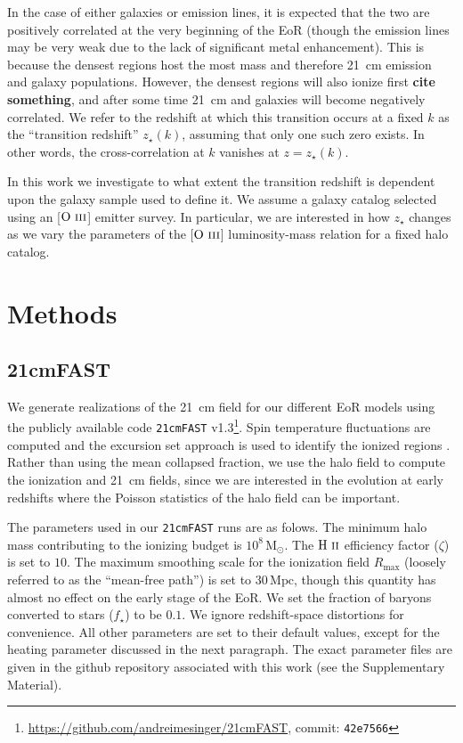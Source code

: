 \documentclass[a4paper,fleqn,usenatbib]{mnras}
\newcommand{\tfast}{\texttt{21cmFAST}}
\newcommand{\HII}{\ensuremath{\text{H~\textsc{ii}}}}
\newcommand{\OIII}{\ensuremath{\text{O~\textsc{iii}}}}
\newcommand{\Msun}{\ensuremath{\text{M}_\odot}}
\newcommand{\Mpc}{\ensuremath{\text{Mpc}}}
\begin{document}
In the case of either galaxies or emission lines, it is expected that the two
are positively correlated at the very beginning of the EoR (though the
emission lines may be very weak due to the lack of significant metal
enhancement). This is because the densest regions host the most mass and
therefore 21~cm emission and galaxy populations. However, the densest regions
will also ionize first {\bf cite something}, and after some time 21~cm and
galaxies will become negatively correlated. We refer to the redshift at which
this transition occurs at a fixed $k$ as the ``transition redshift''
$z_\star(k)$, assuming that only one such zero exists. In other words, the
cross-correlation at $k$ vanishes at $z=z_{\star}(k)$.

In this work we investigate to what extent the transition redshift is
dependent upon the galaxy sample used to define it. We assume a galaxy catalog
selected using an [\OIII] emitter survey. In particular, we are interested in
how $z_\star$ changes as we vary the parameters of the [\OIII] luminosity-mass
relation for a fixed halo catalog.

\section{Methods} \label{sec:methods}
\subsection{21cmFAST} \label{ssec:tfast}
We generate realizations of the 21~cm field for our different EoR models using
the publicly available code \tfast{}
v1.3\footnote{\url{https://github.com/andreimesinger/21cmFAST}, commit:
\texttt{42e7566}}. Spin temperature fluctuations are computed and the
excursion set approach is used to identify the ionized regions
\citep{2011MNRAS.411..955M}. Rather than using the mean collapsed fraction, we
use the halo field to compute the ionization and 21~cm fields, since we are
interested in the evolution at early redshifts where the Poisson statistics of
the halo field can be important.

The parameters used in our \tfast{} runs are as folows. The minimum halo mass
contributing to the ionizing budget is $10^{8}\,\Msun$. The \HII{} efficiency
factor ($\zeta$) is set to $10$. The maximum smoothing scale for the
ionization field $R_{\text{max}}$ (loosely referred to as the ``mean-free
path'') is set to $30\,\Mpc$, though this quantity has almost no effect on the
early stage of the EoR. We set the fraction of baryons converted to stars
($f_\star$) to be $0.1$. We ignore redshift-space distortions for convenience.
All other parameters are set to their default values, except for the heating
parameter discussed in the next paragraph. The exact parameter files are given
in the github repository associated with this work (see the Supplementary
Material).
\end{document}
